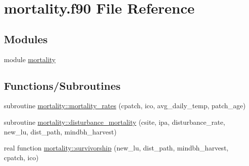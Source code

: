 \hypertarget{mortality_8f90}{}\section{mortality.\+f90 File Reference}
\label{mortality_8f90}
\subsection*{Modules}
\begin{DoxyCompactItemize}
\item 
module \hyperlink{namespacemortality}{mortality}
\end{DoxyCompactItemize}
\subsection*{Functions/\+Subroutines}
\begin{DoxyCompactItemize}
\item 
subroutine \hyperlink{namespacemortality_af7ebabdd3dd650224f2a5ddfac2f888e}{mortality\+::mortality\+\_\+rates} (cpatch, ico, avg\+\_\+daily\+\_\+temp, patch\+\_\+age)
\item 
subroutine \hyperlink{namespacemortality_ad39b2a4fec25ad294a703474c4e5a733}{mortality\+::disturbance\+\_\+mortality} (csite, ipa, disturbance\+\_\+rate, new\+\_\+lu, dist\+\_\+path, mindbh\+\_\+harvest)
\item 
real function \hyperlink{namespacemortality_aae8b4072e1f5c7c59cc76370de99d271}{mortality\+::survivorship} (new\+\_\+lu, dist\+\_\+path, mindbh\+\_\+harvest, cpatch, ico)
\end{DoxyCompactItemize}
